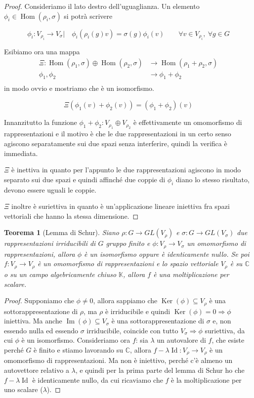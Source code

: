 \documentclass[11pt]{article}
\theoremstyle{plain}
\newtheorem{thm}{Teorema}[section]
\theoremstyle{definition}
\theoremstyle{remark}
\newcommand{\C}{\mathbb{C}}
\newcommand{\K}{\mathbb{K}}
\DeclareMathOperator{\Hom}{Hom}
\DeclareMathOperator{\Ker}{Ker}
\DeclareMathOperator{\Imm}{Im}
\DeclareMathOperator{\Id}{Id}
\begin{document}
\begin{proof}
Consideriamo il lato destro dell'uguaglianza. Un elemento $\phi_i \in \Hom(\rho_i, \sigma)$ si potrà scrivere

\[
\phi_i :V_{\rho_i} \to V_\sigma | \quad \phi_i\left( \rho_i(g) v\right) = \sigma(g) \phi_i(v) \qquad \forall v \in V_{\rho_i}, \ \forall g \in G 
\]

Esibiamo ora una mappa 
\begin{align*}
\Xi :  \Hom(\rho_1, \sigma) \oplus \Hom(\rho_2, \sigma) &\to \Hom(\rho_1 + \rho_2, \sigma) \\
\phi_1 , \phi_2                                       &\to \phi_1 + \phi_2 \\
\end{align*}
 in modo ovvio e mostriamo che è un isomorfismo. 

\[ \Xi (\phi_1(v) + \phi_2(v)) = (\phi_1 + \phi_2) (v) \]


Innanzitutto la funzione $\phi_1 + \phi_2 : V_{\rho_1} \oplus V_{\rho_2}$ è effettivamente un omomorfismo di rappresentazioni e il motivo è che le due rappresentazioni in un certo senso agiscono separatamente sui due spazi senza interferire, quindi la verifica è immediata. 

$\Xi$ è inettiva in quanto per l'appunto le due rappresentazioni agiscono in modo separato sui due spazi e quindi affinché due coppie di $\phi_i$ diano lo stesso risultato, devono essere uguali le coppie.

$\Xi$ inoltre è suriettiva in quanto è un'applicazione lineare iniettiva fra spazi vettoriali che hanno la stessa dimensione.

\end{proof}


\begin{thm}[Lemma di Schur]
Siano $\rho: G \to GL(V_\rho)$ e $\sigma: G \to GL(V_\sigma)$ due rappresentazioni irriducibili di $G$ gruppo finito e $\phi:V_\rho \to V_\sigma$ un omomorfismo di rappresentazioni, allora $\phi$ è un isomorfismo oppure è identicamente nullo. Se poi $f:V_\rho\to V_\rho$ è un omomorfismo di rappresentazioni e lo spazio vettoriale $V_\rho$ è su $\C$ o su un campo algebricamente chiuso $\K$, allora $f$ è una moltiplicazione per scalare.
\end{thm}
\begin{proof}
Supponiamo che $\phi\neq 0$, allora sappiamo che $\Ker(\phi)\subseteq V_\rho$ è una sottorappresentazione di $\rho$, ma $\rho$ è irriducibile e quindi $\Ker(\phi)=0\Rightarrow \phi$ iniettiva. Ma anche $\Imm(\phi)\subseteq V_{\sigma}$ è una sottorappresentazione di $\sigma$ e, non essendo nulla ed essendo $\sigma$ irriducibile, coincide con tutto $V_\sigma \Rightarrow \phi$ suriettiva, da cui $\phi$ è un isomorfismo.
Consideriamo ora $f$: sia $\lambda$ un autovalore di $f$, che esiste perché $G$ è finito e stiamo lavorando su $\C$, allora $f-\lambda \Id:V_\rho\to V_\rho$ è un omomorfismo di rappresentazioni. Ma non è iniettivo, perché c'è almeno un autovettore relativo a $\lambda$, e quindi per la prima parte del lemma di Schur ho che $f-\lambda \Id$ è identicamente nullo, da cui ricaviamo che $f$ è la moltiplicazione per uno scalare ($\lambda$).
\end{proof}
\end{document}
